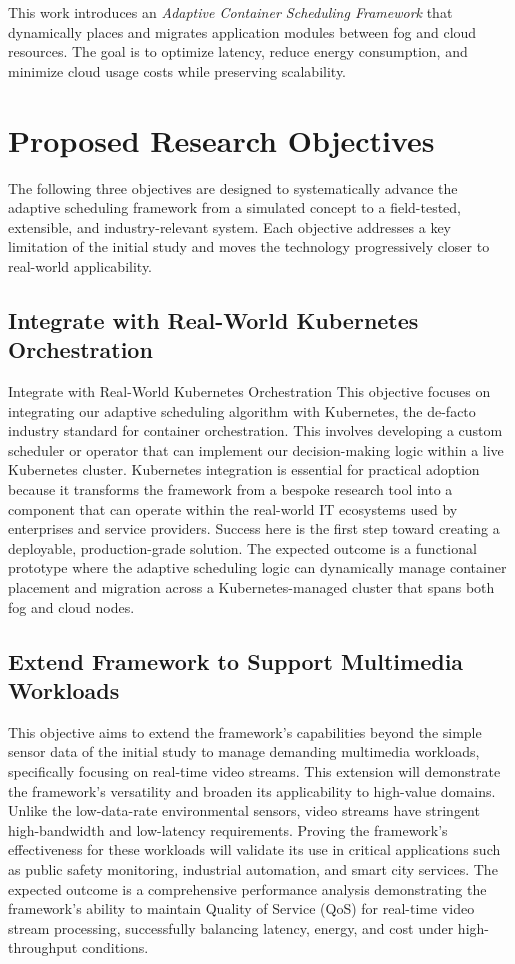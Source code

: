 \documentclass[conference]{IEEEtran}
\begin{document}
	This work introduces an \textit{Adaptive Container Scheduling Framework} that dynamically places and migrates application modules between fog and cloud resources. The goal is to optimize latency, reduce energy consumption, and minimize cloud usage costs while preserving scalability.
	
	\section{Proposed Research Objectives}
	The following three objectives are designed to systematically advance the adaptive scheduling framework from a simulated concept to a field-tested, extensible, and industry-relevant system. Each objective addresses a key limitation of the initial study and moves the technology progressively closer to real-world applicability.
	
	\subsection{Integrate with Real-World Kubernetes Orchestration}
	Integrate with Real-World Kubernetes Orchestration
	This objective focuses on integrating our adaptive scheduling algorithm with Kubernetes, the de-facto industry standard for container orchestration. This involves developing a custom scheduler or operator that can implement our decision-making logic within a live Kubernetes cluster.
	Kubernetes integration is essential for practical adoption because it transforms the framework from a bespoke research tool into a component that can operate within the real-world IT ecosystems used by enterprises and service providers. Success here is the first step toward creating a deployable, production-grade solution.
	The expected outcome is a functional prototype where the adaptive scheduling logic can dynamically manage container placement and migration across a Kubernetes-managed cluster that spans both fog and cloud nodes.
	
	\subsection{Extend Framework to Support Multimedia Workloads}
	This objective aims to extend the framework's capabilities beyond the simple sensor data of the initial study to manage demanding multimedia workloads, specifically focusing on real-time video streams.
	This extension will demonstrate the framework's versatility and broaden its applicability to high-value domains. Unlike the low-data-rate environmental sensors, video streams have stringent high-bandwidth and low-latency requirements. Proving the framework's effectiveness for these workloads will validate its use in critical applications such as public safety monitoring, industrial automation, and smart city services.
	The expected outcome is a comprehensive performance analysis demonstrating the framework's ability to maintain Quality of Service (QoS) for real-time video stream processing, successfully balancing latency, energy, and cost under high-throughput conditions.
	
\end{document}

